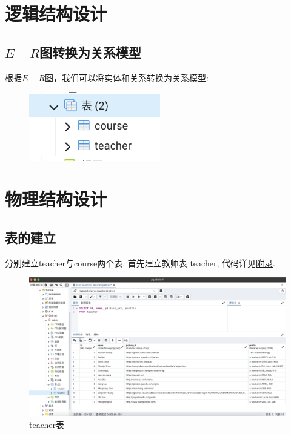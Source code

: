 \documentclass[12pt, oneside]{ctexart}
\numberwithin{figure}{section}
\numberwithin{table}{section}
\begin{document}
\section{逻辑结构设计}

\subsection{$E-R$图转换为关系模型}

根据$E-R$图，我们可以将实体和关系转换为关系模型:
\begin{figure}[htbp]
    \centering
    \includegraphics[height = 3cm]{images/sec3/table.png}
\end{figure}

\section{物理结构设计}

\subsection{表的建立}

分别建立teacher与course两个表.
\newpage
首先建立教师表 teacher, 代码详见\hyperref[teacher_query]{附录}.
\begin{figure}[!htbp]
    \centering
    \includegraphics[width=13cm]{images/sec4/teacher.png}
    \caption{teacher表}
\end{figure}
\end{document}
